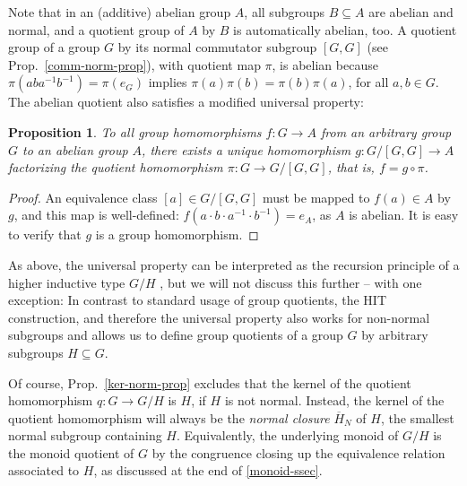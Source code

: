 \documentclass{amsart}
\theoremstyle{plain}
\numberwithin{equation}{section} %
\numberwithin{figure}{section} %
\theoremstyle{plain}
\theoremstyle{plain}
\theoremstyle{plain}
\theoremstyle{plain}
\theoremstyle{plain}
\newtheorem{prop}[thm]{Proposition} %
\theoremstyle{plain}
\theoremstyle{remark}
\theoremstyle{remark}
\theoremstyle{remark}
\begin{document}
Note that in an (additive) abelian group $A$, all subgroups $B \subseteq A$ are abelian 
and normal, 
and a quotient group of $A$ by $B$ is automatically abelian, too. 
A quotient group of a group $G$ by its normal commutator subgroup $[G,G]$ (see Prop.~\ref{comm-norm-prop}), with quotient map $\pi$, is abelian because $\pi(aba^{-1}b^{-1}) = \pi(e_G)$ implies $\pi(a)\pi(b) = \pi(b)\pi(a)$, for all $a,b \in G$. 
The abelian quotient also satisfies a modified universal property:
\begin{prop} \label{commutator-quot-prop}
To all group homomorphisms $f : G \rightarrow A$ from an arbitrary group $G$ to an abelian group $A$, there exists a unique homomorphism $g : G/[G,G] \rightarrow A$ factorizing the quotient homomorphism $\pi : G \rightarrow G/[G,G]$, that is, $f = g \circ \pi$.
\end{prop}
\begin{proof}
An equivalence class $[a] \in G/[G,G]$ must be mapped to $f(a) \in A$ by $g$, and this map is well-defined:
$f(a \cdot b \cdot a^{-1} \cdot b^{-1}) = e_A$, as $A$ is abelian. It is easy to verify that $g$ is a group homomorphism.
\end{proof}

As above, the universal property can be interpreted as the recursion principle of a higher inductive type $G/H$ , but we will not discuss this further  -- with one exception: In contrast to standard usage of group quotients, the HIT construction, and therefore the universal property also works for non-normal subgroups and allows us to define group quotients of a group $G$ by arbitrary subgroups $H \subseteq G$. 

Of course, Prop.~\ref{ker-norm-prop} excludes that the kernel of the quotient homomorphism $q : G \rightarrow G/H$ is $H$, if $H$ is not normal. Instead, the kernel of the quotient homomorphism will always be the \textit{normal closure} $\overline{H}_N$ of $H$, the smallest normal subgroup containing $H$. Equivalently, the underlying monoid of $G/H$ is the monoid quotient of $G$ by the congruence closing up the equivalence relation associated to $H$, as discussed at the end of \ref{monoid-ssec}.
\end{document}
